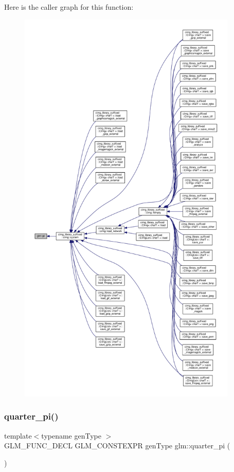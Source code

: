 Here is the caller graph for this function\+:
\nopagebreak
\begin{figure}[H]
\begin{center}
\leavevmode
\includegraphics[height=550pt]{d7/d6f/group__gtc__constants_ga94bafeb2a0f23ab6450fed1f98ee4e45_icgraph}
\end{center}
\end{figure}
\mbox{\label{group__gtc__constants_ga3c9df42bd73c519a995c43f0f99e77e0}} 
\subsubsection{\texorpdfstring{quarter\+\_\+pi()}{quarter\_pi()}}
{\footnotesize\ttfamily template$<$typename gen\+Type $>$ \\
G\+L\+M\+\_\+\+F\+U\+N\+C\+\_\+\+D\+E\+CL G\+L\+M\+\_\+\+C\+O\+N\+S\+T\+E\+X\+PR gen\+Type glm\+::quarter\+\_\+pi (\begin{DoxyParamCaption}{ }\end{DoxyParamCaption})}



